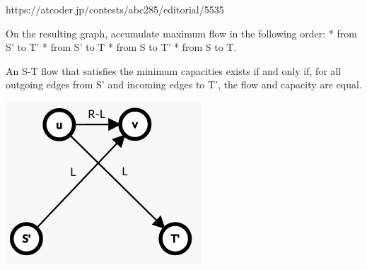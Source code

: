 https://atcoder.jp/contests/abc285/editorial/5535

On the resulting graph, 
accumulate maximum flow in the following order:
* from S' to T'
* from S' to T
* from S to T'
* from S to T.

An S-T flow that satisfies the minimum capacities 
exists if and only if, for all outgoing edges 
from S' and incoming edges to T', 
the flow and capacity are equal.

\begin{center}\begin{minipage}{50mm}
\includegraphics[width=\textwidth]{content/graphs/max-flow-min-capacities.png}
\end{minipage}\end{center}
